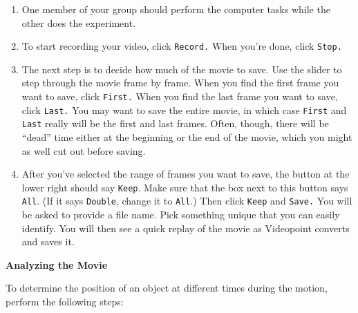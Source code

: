 \begin{enumerate}
\item One member of your group should perform the computer tasks while the
other does the experiment.

\item To start recording your video, click {\tt Record.}  When
you're done, click {\tt Stop.}

\item The next step is to decide how much of the movie to save.
Use the slider to step through the movie frame by frame.  When you
find the first frame you want to save, click {\tt First.}  When you find
the last frame you want to save, click {\tt Last.}  
You may want to save the 
entire movie, in which case {\tt First} and {\tt Last} really will be the
first and last frames.  Often, though, there will be ``dead'' time
either at the beginning or the end of the movie, which you might
as well cut out before saving.

\item After you've selected the range of frames you want to save, the button
at the lower right should say {\tt Keep}.  Make sure that the 
box next to this button says {\tt All}.  (If it says {\tt Double},
change it to {\tt All}.)
Then click {\tt Keep}
and {\tt Save.}  You will be asked to provide a file name. Pick something unique that you can easily identify.
You will then see a quick replay of the movie as Videopoint
converts and saves it.


\end{enumerate}
\textbf{Analyzing the Movie} 

To determine the position of an object at different times during the
motion, perform the following steps:

